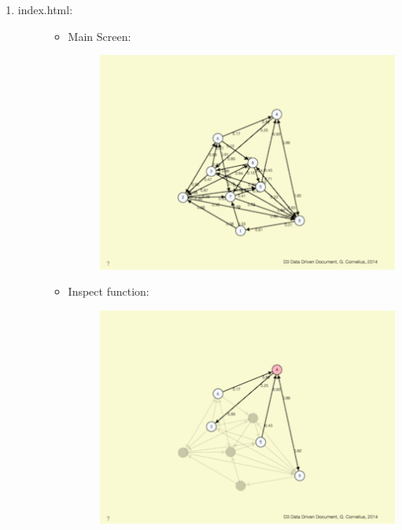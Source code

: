 \documentclass[letterpaper,10pt,english]{sphinxmanual}
\begin{document}
\begin{fulllineitems}
\begin{fulllineitems}
\begin{description}
\begin{enumerate}
\begin{description}
\end{description}

\item {} \begin{description}
\item[{index.html:   }] \leavevmode\begin{itemize}
\item {} \begin{description}
\item[{Main Screen:}] \leavevmode
\includegraphics{randomvaluation_d3_main.png}

\end{description}

\item {} \begin{description}
\item[{Inspect function:}] \leavevmode
\includegraphics{randomvaluation_d3_inspect.png}

\end{description}

\end{itemize}

\end{description}


\end{enumerate}
\end{description}
\end{fulllineitems}
\end{fulllineitems}
\end{document}

